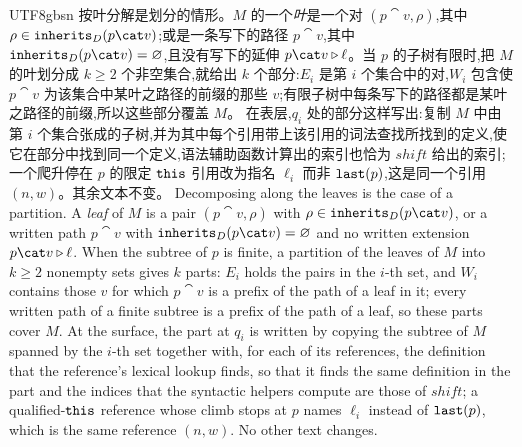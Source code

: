 \begin{CJK*}{UTF8}{gbsn}
\ifPaperChinese
按叶分解是划分的情形。$M$ 的一个\emph{叶}是一个对 $(p \cat v, \rho)$,其中 $\rho \in \inherits_D(p \cat v)$;或是一条写下的路径 $p \cat v$,其中 $\inherits_D(p \cat v) = \varnothing$,且没有写下的延伸 $p \cat v \snoc \ell$。当 $p$ 的子树有限时,把 $M$ 的叶划分成 $k \ge 2$ 个非空集合,就给出 $k$ 个部分:$E_i$ 是第 $i$ 个集合中的对,$W_i$ 包含使 $p \cat v$ 为该集合中某叶之路径的前缀的那些 $v$;有限子树中每条写下的路径都是某叶之路径的前缀,所以这些部分覆盖 $M$。
在表层,$q_i$ 处的部分这样写出:复制 $M$ 中由第 $i$ 个集合张成的子树,并为其中每个引用带上该引用的词法查找所找到的定义,使它在部分中找到同一个定义,语法辅助函数计算出的索引也恰为 $\mathit{shift}$ 给出的索引;一个爬升停在 $p$ 的限定 $\mathtt{this}$ 引用改为指名 $\ell_i$ 而非 $\mathtt{last}(p)$,这是同一个引用 $(n, w)$。其余文本不变。
\else
Decomposing along the leaves is the case of a partition. A \emph{leaf} of $M$ is a pair
$(p \cat v, \rho)$ with $\rho \in \inherits_D(p \cat v)$, or a written path $p \cat v$ with
$\inherits_D(p \cat v) = \varnothing$ and no written extension $p \cat v \snoc \ell$. When the subtree
of $p$ is finite, a partition of the leaves of $M$ into $k \ge 2$ nonempty sets gives $k$ parts: $E_i$
holds the pairs in the $i$-th set, and $W_i$ contains those $v$ for which $p \cat v$ is a prefix of the
path of a leaf in it; every written path of a finite subtree is a prefix of the path of a leaf, so these
parts cover $M$.
At the surface, the part at $q_i$ is written by copying the subtree of $M$ spanned by the $i$-th set together
with, for each of its references, the definition that the reference's lexical lookup finds, so that it
finds the same definition in the part and the indices that the syntactic helpers compute are those of
$\mathit{shift}$; a qualified-$\mathtt{this}$ reference whose climb stops
at $p$ names $\ell_i$ instead of $\mathtt{last}(p)$, which is the same reference $(n, w)$. No other text changes.
\fi


\end{CJK*}
